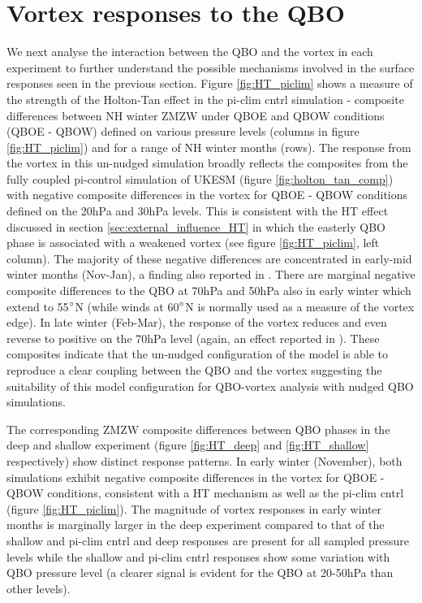 \section{Vortex responses to the QBO}
\label{sec:vortex_responses_QBO}
We next analyse the interaction between the QBO and the vortex in each experiment to further understand the possible mechanisms involved in the surface responses seen in the previous section. Figure \ref{fig:HT_piclim} shows a measure of the strength of the Holton-Tan effect in the pi-clim cntrl simulation -  composite differences between NH winter ZMZW under QBOE and QBOW conditions (QBOE - QBOW) defined on various pressure levels (columns in figure \ref{fig:HT_piclim}) and for a range of NH winter months (rows). The response from the vortex in this un-nudged simulation broadly reflects the composites from the fully coupled pi-control simulation of UKESM (figure \ref{fig:holton_tan_comp}) with negative composite differences in the vortex for QBOE - QBOW conditions defined on the 20hPa and 30hPa levels. This is consistent with the HT effect discussed in section \ref{sec:external_influence_HT} in which the easterly QBO phase is associated with a weakened vortex (see figure \ref{fig:HT_piclim}, left column). The majority of these negative differences are concentrated in early-mid winter months (Nov-Jan), a finding also reported in \cite{graySurface2018b}. There are marginal negative composite differences to the QBO at 70hPa and 50hPa also in early winter which extend to 55$\degree$N (while winds at 60$\degree$N is normally used as a measure of the vortex edge). In late winter (Feb-Mar), the response of the vortex reduces and even reverse to positive on the 70hPa level (again, an effect reported in \cite{graySurface2018b}). These composites indicate that the un-nudged configuration of the model is able to reproduce a clear coupling between the QBO and the vortex suggesting the suitability of this model configuration for QBO-vortex analysis with nudged QBO simulations.

The corresponding ZMZW composite differences between QBO phases in the deep and shallow experiment (figure \ref{fig:HT_deep} and \ref{fig:HT_shallow} respectively) show distinct response patterns. In early winter (November), both simulations exhibit negative composite differences in the vortex for QBOE - QBOW conditions, consistent with a HT mechanism \citep{HoltonJamesRTan1980} as well as the pi-clim cntrl (figure \ref{fig:HT_piclim}). The magnitude of vortex responses in early winter months is marginally larger in the deep experiment compared to that of the shallow and pi-clim cntrl and deep responses are present for all sampled pressure levels while the shallow and pi-clim cntrl responses show some variation with QBO pressure level (a clearer signal is evident for the QBO at 20-50hPa than other levels). 

